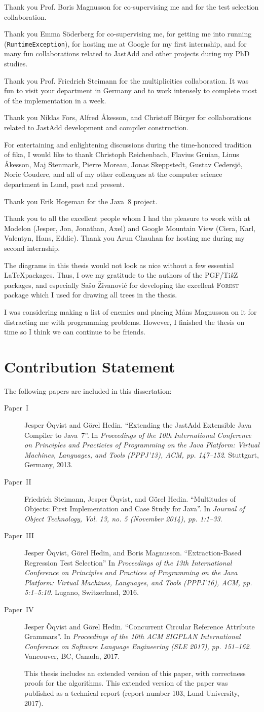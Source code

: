 \documentclass[10pt, twoside, openright]{book}
\newcommand{\paperIref}{%
Jesper Öqvist and Görel Hedin.
``Extending the JastAdd Extensible Java Compiler to Java~7''.
In \emph{Proceedings of the 10th International Conference on Principles and Practicies of
Programming on the Java Platform: Virtual Machines, Languages, and Tools (PPPJ'13), ACM,
pp. 147--152}. Stuttgart, Germany, 2013.
}
\newcommand{\paperIIref}{%
Friedrich Steimann, Jesper Öqvist, and Görel Hedin.
``Multitudes of Objects: First Implementation and Case Study for Java''.
In \emph{Journal of Object Technology, Vol. 13, no. 5 (November 2014), pp. 1:1--33}.
}
\newcommand{\paperIIIref}{%
Jesper Öqvist, Görel Hedin, and Boris Magnusson.
``Extraction-Based Regression Test Selection''
In \emph{Proceedings of the 13th International Conference on Principles and
Practices of Programming on the Java Platform: Virtual Machines, Languages, and Tools (PPPJ'16), ACM,
pp. 5:1--5:10}. Lugano, Switzerland, 2016.
}
\newcommand{\paperIVref}{%
Jesper Öqvist and Görel Hedin.
``Concurrent Circular Reference Attribute Grammars''.
In \emph{Proceedings of the 10th ACM SIGPLAN International Conference on Software Language
Engineering (SLE 2017), pp. 151--162}. Vancouver, BC, Canada, 2017.
}
\begin{document}
Thank you Prof. Boris Magnusson for co-supervising me and for the test
selection collaboration.

Thank you Emma Söderberg for co-supervising me, for getting me into running
(\texttt{RuntimeException}), for hosting me at Google for my first internship,
and for many fun collaborations related to JastAdd and other projects during my PhD studies.

Thank you Prof. Friedrich Steimann for the multiplicities collaboration. It was fun to visit
your department in Germany and to work intensely to complete most of the implementation in
a week.

Thank you Niklas Fors, Alfred Åkesson, and Christoff B{\"{u}}rger for collaborations
related to JastAdd development and compiler construction.

For entertaining and enlightening discussions during the time-honored tradition
of fika, I would like to thank
Christoph Reichenbach, Flavius Gruian,
Linus Åkesson, Maj Stenmark, Pierre Moreau,
Jonas Skeppstedt, Gustav Cedersjö, Noric Couderc,
and all of my other colleagues at the computer science department in
Lund, past and present.

Thank you Erik Hogeman for the Java~8 project.

Thank you to all the excellent people whom I had the pleasure to work with at Modelon (Jesper, Jon,
Jonathan, Axel) and Google Mountain View (Ciera, Karl, Valentyn, Hans, Eddie).  Thank you Arun
Chauhan for hosting me during my second internship.

The diagrams in this thesis would not look as nice without a few
essential \LaTeX packages.  Thus, I owe my gratitude to the authors of the
\textsc{PGF}/{\rm Ti\emph{k}Z} packages, and especially Sa\v{s}o
\v{Z}ivanovi\'{c} for developing the excellent \textsc{Forest} package which
I used for drawing all trees in the thesis.

{\singlespacing\footnotesize
I was considering making a list of enemies and placing Måns Magnusson on it for distracting me with
programming problems. However, I finished the thesis on time so I think we can continue to be friends.}


\newpage
\section*{Contribution Statement}

The following papers are included in this dissertation:

\begin{description}
  \item[Paper~I]
    \paperIref
  \item[Paper~II]
    \paperIIref
  \item[Paper~III]
    \paperIIIref
  \item[Paper~IV]
    \paperIVref

    This thesis includes an extended version of this paper, with correctness proofs for the
    algorithms.
    This extended version of the paper was published as a technical report (report number 103,
    Lund University, 2017).
\end{description}
\end{document}
